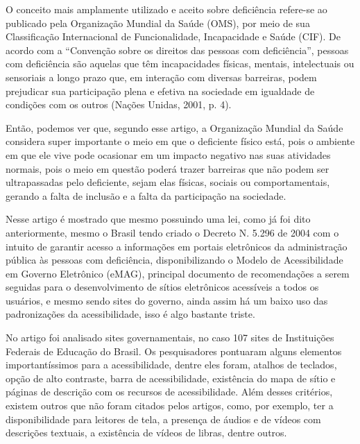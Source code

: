 \documentclass[a4paper]{article}
\begin{document}
\begin{titlepage}
\hspace{0.19\textwidth} %
\begin{minipage}{0.75\textwidth}
	\fontsize{10pt}{0pt}\selectfont
	O conceito mais amplamente utilizado e aceito sobre deficiência refere-se ao publicado pela Organização Mundial da Saúde (OMS), por meio de sua Classificação Internacional de Funcionalidade, Incapacidade e Saúde (CIF). De acordo com a “Convenção sobre os direitos das pessoas com deficiência”, pessoas com deficiência são aquelas que têm incapacidades físicas, mentais, intelectuais ou sensoriais a longo prazo que, em interação com diversas barreiras, podem prejudicar sua participação plena e efetiva na sociedade em igualdade de condições com os outros (Nações Unidas, 2001, p. 4).\\[0.5cm]
\end{minipage}

Então, podemos ver que, segundo esse artigo, a Organização Mundial da Saúde considera super importante o meio em que o deficiente físico está, pois o ambiente em que ele vive pode ocasionar em um impacto negativo nas suas atividades normais, pois o meio em questão poderá trazer barreiras que não podem ser ultrapassadas pelo deficiente, sejam elas físicas, sociais ou comportamentais, gerando a falta de inclusão e a falta da participação na sociedade.

Nesse artigo é mostrado que mesmo possuindo uma lei, como já foi dito anteriormente, mesmo o Brasil tendo criado o Decreto N. 5.296 de 2004 com o intuito de garantir acesso a informações em portais eletrônicos da administração pública às pessoas com deficiência, disponibilizando o Modelo de Acessibilidade em Governo Eletrônico (eMAG), principal documento de recomendações a serem seguidas para o desenvolvimento de sítios eletrônicos acessíveis a todos os usuários, e mesmo sendo sites do governo, ainda assim há um baixo uso das padronizações da acessibilidade, isso é algo bastante triste. 

No artigo foi analisado sites governamentais, no caso 107 sites de Instituições Federais de Educação do Brasil. Os pesquisadores pontuaram alguns elementos importantíssimos para a acessibilidade, dentre eles foram, atalhos de teclados, opção de alto contraste, barra de acessibilidade, existência do mapa de sítio e páginas de descrição com os recursos de acessibilidade. Além desses critérios, existem outros que não foram citados pelos artigos, como, por exemplo, ter a disponibilidade para leitores de tela, a presença de áudios e de vídeos com descrições textuais, a existência de vídeos de libras, dentre outros.


\end{titlepage}
\end{document}
